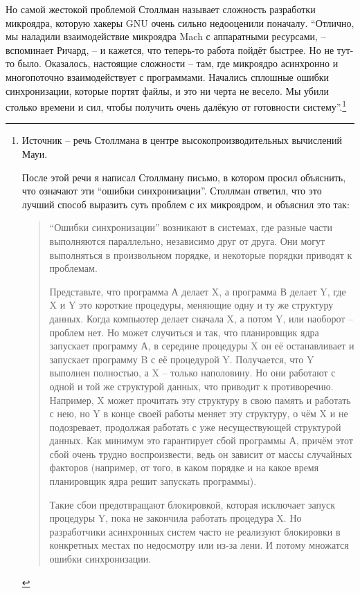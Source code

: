 Но самой жестокой проблемой Столлман называет сложность разработки микроядра, которую хакеры GNU очень сильно недооценили поначалу. \enquote{Отлично, мы наладили взаимодействие микроядра Mach с аппаратными ресурсами, -- вспоминает Ричард, -- и кажется, что теперь-то работа пойдёт быстрее. Но не тут-то было. Оказалось, настоящие сложности -- там, где микроядро асинхронно и многопоточно взаимодействует с программами. Начались сплошные ошибки синхронизации, которые портят файлы, и это ни черта не весело. Мы убили столько времени и сил, чтобы получить очень далёкую от готовности систему}.\footnote{Источник -- речь Столлмана в центре высокопроизводительных вычислений Мауи.

После этой речи я написал Столлману письмо, в котором просил объяснить, что означают эти \enquote{ошибки синхронизации}. Столлман ответил, что это лучший способ выразить суть проблем с их микроядром, и объяснил это так:

\begin{quote}
\enquote{Ошибки синхронизации} возникают в системах, где разные части выполняются параллельно, независимо друг от друга. Они могут выполняться в произвольном порядке, и некоторые порядки приводят к проблемам.

Представьте, что программа А делает X, а программа В делает Y, где X и Y это короткие процедуры, меняющие одну и ту же структуру данных. Когда компьютер делает сначала X, а потом Y, или наоборот -- проблем нет. Но может случиться и так, что планировщик ядра запускает программу А, в середине процедуры X он её останавливает и запускает программу B с её процедурой Y. Получается, что Y выполнен полностью, а X -- только наполовину. Но они работают с одной и той же структурой данных, что приводит к противоречию. Например, X может прочитать эту структуру в свою память и работать с нею, но Y в конце своей работы меняет эту структуру, о чём X и не подозревает, продолжая работать с уже несуществующей структурой данных. Как минимум это гарантирует сбой программы А, причём этот сбой очень трудно воспроизвести, ведь он зависит от массы случайных факторов (например, от того, в каком порядке и на какое время планировщик ядра решит запускать программы).

Такие сбои предотвращают блокировкой, которая исключает запуск процедуры Y, пока не закончила работать процедура X. Но разработчики асинхронных систем часто не реализуют блокировки в конкретных местах по недосмотру или из-за лени. И потому множатся ошибки синхронизации.
\end{quote}}

